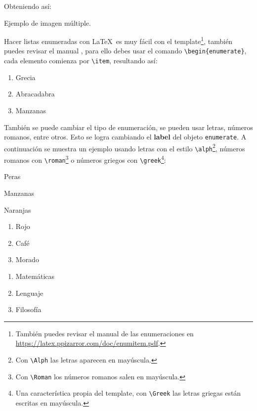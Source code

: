 	Obteniendo así:

	\begin{images}{Ejemplo de imagen múltiple.}
		\imagesnewline
	\end{images}

\clearpage
{}


	Hacer listas enumeradas con \LaTeX\ es muy fácil con el template\footnote{También puedes revisar el manual de las enumeraciones en \url{https://latex.ppizarror.com/doc/enumitem.pdf}.}, también puedes revisar el manual \cite{template}, para ello debes usar el comando \texttt{\textbackslash begin\{enumerate\}}, cada elemento comienza por \texttt{\textbackslash item}, resultando así:

	\begin{enumerate}
		\item Grecia
		\item Abracadabra
		\item Manzanas
	\end{enumerate}

	También se puede cambiar el tipo de enumeración, se pueden usar letras, números romanos, entre otros. Esto se logra cambiando el \textbf{label} del objeto \texttt{enumerate}. A continuación se muestra un ejemplo usando letras con el estilo \texttt{\textbackslash alph}\footnote{Con \texttt{\textbackslash Alph} las letras aparecen en mayúscula.}, números romanos con \texttt{\textbackslash roman}\footnote{Con \texttt{\textbackslash Roman} los números romanos salen en mayúscula.} o números griegos con \texttt{\textbackslash greek}\footnote{Una característica propia del template, con \texttt{\textbackslash Greek} las letras griegas están escritas en mayúscula.}:

	\begin{multicols}{3}
		\begin{enumeratebf}[label=\alph*) ] %
			\item Peras
			\item Manzanas
			\item Naranjas
		\end{enumeratebf}

		\begin{enumerate}[label=\roman*) ]
			\item Rojo
			\item Café
			\item Morado
		\end{enumerate}
		
		\begin{enumerate}[label=\greek*) ]
			\item Matemáticas
			\item Lenguaje
			\item Filosofía
		\end{enumerate}
	\end{multicols}

